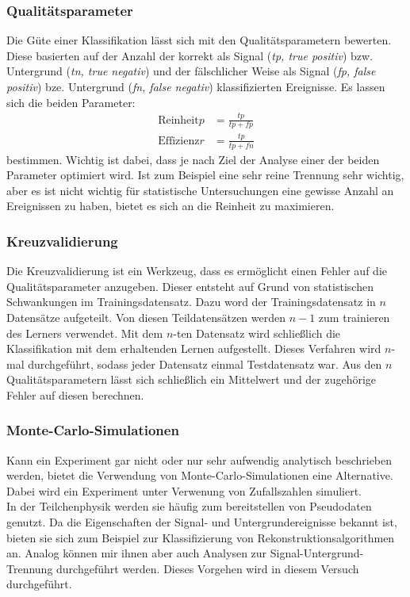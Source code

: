 \subsubsection{Qualitätsparameter}
Die Güte einer Klassifikation lässt sich mit den Qualitätsparametern bewerten. Diese basierten auf der Anzahl der korrekt als Signal (\textit{tp, true positiv}) bzw. Untergrund (\textit{tn, true negativ}) und der fälschlicher Weise als Signal (\textit{fp, false positiv}) bze. Untergrund (\textit{fn, false negativ}) klassifizierten Ereignisse. Es lassen sich die beiden Parameter:
\begin{align}
	\text{Reinheit} p &= \frac{tp}{tp+fp}\\
	\text{Effizienz} r &= \frac{tp}{tp+fn}
\end{align}
bestimmen. Wichtig ist dabei, dass je nach Ziel der Analyse einer der beiden Parameter optimiert wird. Ist zum Beispiel eine sehr reine Trennung sehr wichtig, aber es ist nicht wichtig für statistische Untersuchungen eine gewisse Anzahl an Ereignissen zu haben, bietet es sich an die Reinheit zu maximieren.
\subsubsection{Kreuzvalidierung}
Die Kreuzvalidierung ist ein Werkzeug, dass es ermöglicht einen Fehler auf die Qualitätsparameter anzugeben. Dieser entsteht auf Grund von statistischen Schwankungen im Trainingsdatensatz. Dazu word der Trainingsdatensatz in $n$ Datensätze aufgeteilt. Von diesen Teildatensätzen werden $n-1$ zum trainieren des Lerners verwendet. Mit dem $n$-ten Datensatz wird schließlich die Klassifikation mit dem erhaltenden Lernen aufgestellt. Dieses Verfahren wird $n$-mal durchgeführt, sodass jeder Datensatz einmal Testdatensatz war. Aus den $n$ Qualitätsparametern lässt sich schließlich ein Mittelwert und der zugehörige Fehler auf diesen berechnen.
\subsubsection{Monte-Carlo-Simulationen}
Kann ein Experiment gar nicht oder nur sehr aufwendig analytisch beschrieben werden, bietet die Verwendung von Monte-Carlo-Simulationen eine Alternative. Dabei wird ein Experiment unter Verwenung von Zufallszahlen simuliert. \\
In der Teilchenphysik werden sie häufig zum bereitstellen von Pseudodaten genutzt. Da die Eigenschaften der Signal- und Untergrundereignisse bekannt ist, bieten sie sich zum Beispiel zur Klassifizierung von Rekonstruktionsalgorithmen an. Analog können mir ihnen aber auch Analysen zur Signal-Untergrund-Trennung durchgeführt werden. Dieses Vorgehen wird in diesem Versuch durchgeführt.
